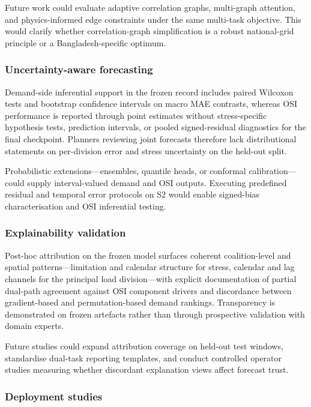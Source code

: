 Future work could evaluate adaptive correlation graphs, multi-graph attention, and physics-informed edge constraints under the same multi-task objective. This would clarify whether correlation-graph simplification is a robust national-grid principle or a Bangladesh-specific optimum.

\subsubsection{Uncertainty-aware forecasting}\label{subsubsection:uncertainty_aware_forecasting}

Demand-side inferential support in the frozen record includes paired Wilcoxon tests and bootstrap confidence intervals on macro MAE contrasts, whereas OSI performance is reported through point estimates without stress-specific hypothesis tests, prediction intervals, or pooled signed-residual diagnostics for the final checkpoint. Planners reviewing joint forecasts therefore lack distributional statements on per-division error and stress uncertainty on the held-out split.

Probabilistic extensions---ensembles, quantile heads, or conformal calibration---could supply interval-valued demand and OSI outputs. Executing predefined residual and temporal error protocols on S2 would enable signed-bias characterisation and OSI inferential testing.

\subsubsection{Explainability validation}\label{subsubsection:explainability_validation}

Post-hoc attribution on the frozen model surfaces coherent coalition-level and spatial patterns---limitation and calendar structure for stress, calendar and lag channels for the principal load division---with explicit documentation of partial dual-path agreement against OSI component drivers and discordance between gradient-based and permutation-based demand rankings. Transparency is demonstrated on frozen artefacts rather than through prospective validation with domain experts.

Future studies could expand attribution coverage on held-out test windows, standardise dual-task reporting templates, and conduct controlled operator studies measuring whether discordant explanation views affect forecast trust.

\subsubsection{Deployment studies}\label{subsubsection:deployment_studies}

